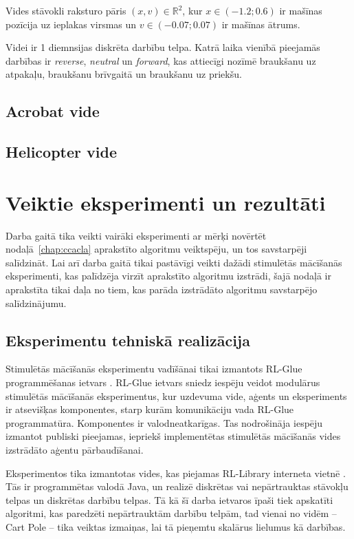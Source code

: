 \documentclass{ludis} %
\begin{document}
Vides stāvokli raksturo pāris $(x, v) \in \mathbb{R}^2$, kur $x \in (-1.2; 0.6)$
ir mašīnas pozīcija uz ieplakas virsmas un $v \in (-0.07; 0.07)$ ir mašīnas
ātrums.

Videi ir 1 diemnsijas diskrēta darbību telpa. Katrā laika vienībā pieejamās
darbības ir \textit{reverse}, \textit{neutral} un \textit{forward}, kas
attiecīgi nozīmē braukšanu uz atpakaļu, braukšanu brīvgaitā un braukšanu uz
priekšu.

\section{Acrobat vide}

\section{Helicopter vide}



\chapter{Veiktie eksperimenti un rezultāti}\label{chap:exp}
Darba gaitā tika veikti vairāki eksperimenti ar mērķi novērtēt
nodaļā~\ref{chap:ccacla} aprakstīto algoritmu veiktspēju, un tos savstarpēji
salīdzināt. Lai arī darba gaitā tikai pastāvīgi veikti dažādi stimulētās
mācīšanās eksperimenti, kas palīdzēja virzīt aprakstīto algoritmu izstrādi, šajā
nodaļā ir aprakstīta tikai daļa no tiem, kas parāda izstrādāto algoritmu
savstarpējo salīdzinājumu.

\section{Eksperimentu tehniskā realizācija}
Stimulētās mācīšanās eksperimentu vadīšānai tikai izmantots RL-Glue
programmēšanas ietvars \autocite{rl-glue}. RL-Glue ietvars sniedz iespēju veidot
modulārus stimulētās mācīšanās eksperimentus, kur uzdevuma vide, aģents un
eksperiments ir atsevišķas komponentes, starp kurām komunikāciju vada RL-Glue
programmatūra. Komponentes ir valodneatkarīgas. Tas nodrošināja iespēju izmantot
publiski pieejamas, iepriekš implementētas stimulētās mācīšanās vides izstrādāto
aģentu pārbaudīšanai. 

Eksperimentos tika izmantotas vides, kas piejamas RL-Library interneta vietnē
\autocite{rl-library}. Tās ir programmētas valodā Java, un realizē diskrētas vai
nepārtrauktas stāvokļu telpas un diskrētas darbību telpas. Tā kā šī darba
ietvaros īpaši tiek apskatīti algoritmi, kas paredzēti nepārtrauktām darbību
telpām, tad vienai no vidēm -- Cart Pole -- tika veiktas izmaiņas, lai tā
pieņemtu skalārus lielumus kā darbības.
\end{document}
